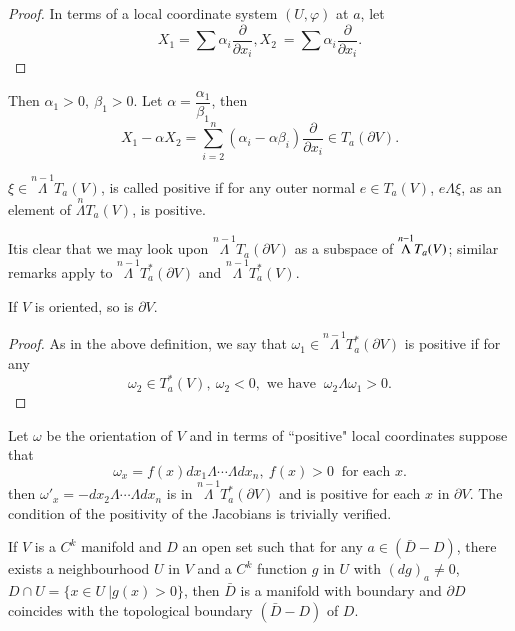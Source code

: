 \begin{proof}
  In terms of a local coordinate system $( U, \varphi )$ at $a$, let 
  $$
  X_1 = \sum \alpha_i  \frac{\partial}{\partial x_i}, X_2 ~ =  \sum
  \alpha_i  \frac{\partial}{\partial x_i}. 
  $$
\end{proof}

Then $\alpha_1 > 0, ~ \beta_1 > 0$. Let $\alpha =
\dfrac{\alpha_1}{\beta_1}$, then 
$$
X_1 - \alpha X_2 = \sum^{n}_{i=2} (\alpha_i  - \alpha \beta_i )
\frac{\partial}{\partial x_i}  \in T_a (\partial V). 
$$

\begin{defi*}
  $\xi \in  \overset{n-1}{\Lambda} T_a (V)$,  is called positive if
  for any outer normal $e \in T_a (V)$, $e \Lambda \xi$, as an element
  of $\overset{n}{\Lambda} T_a (V)$, is positive. 
\end{defi*}
 
It\pageoriginale is clear that we may look upon $\overset{n-1}{\Lambda} T_a
(\partial V)$ as a subspace of $\overset{n-1}{\Lambda}\break T_a (
V)$; similar remarks apply to  $\overset{n-1}{\Lambda} T_a^* (
\partial V)$ and $\overset{n-1}{\Lambda} T_a^* (V)$.

\begin{prop*}
  If $V$ is oriented, so is $\partial V$.
\end{prop*}

\begin{proof}
  As in the above definition, we say that $\omega_1 \in
  \overset{n-1}{\Lambda} T^*_a (\partial V)$ is  positive if for any  
  $$
  \omega_2 \in  T^*_a (V), ~ \omega_2 < 0, \text{ we have } ~ \omega_2
  \Lambda \omega_1 > 0.  
  $$
\end{proof}

Let $\omega$ be the orientation of $V$  and in terms of ``positive"
local coordinates  suppose that  
$$
\omega_x = f(x) dx_1 \Lambda \cdots \Lambda dx_n, ~  f (x) > 0 ~
\text{ for each } x. 
$$
then $\omega'_x  = -dx_2  \Lambda \cdots \Lambda dx_n$ is in
$\overset{n-1}{\Lambda} T_a^* (\partial V)$ and is positive for each
$x$ in $\partial V$. The condition of the positivity of the Jacobians
is trivially verified. 

\begin{remark*}
  If  $V$ is a $C^k$ manifold and $D$ an open set such that for any
  $a \in (\bar{D}- D)$, there exists a neighbourhood $U$ in $V$ and  a
  $C^k$ function $g$ in $U$ with $(dg)_a \neq 0$, $D \cap U = \big\{ x
  \in U ~  \Big| g (x) > 0 \big\}$, then $\bar{D}$ is a  manifold with
  boundary and $\partial D$ coincides with the topological boundary
  $(\bar{D}-D)$ of $D$. 
\end{remark*}

